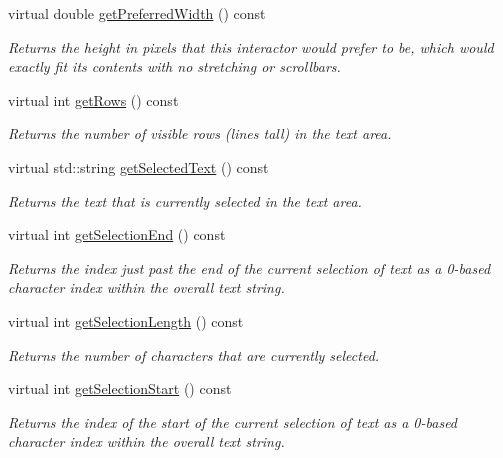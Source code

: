 \begin{DoxyCompactItemize}
virtual double \mbox{\hyperlink{classGInteractor_a82bca31d37700fb0e35d2743352efd5e}{get\+Preferred\+Width}} () const
\begin{DoxyCompactList}\small\item\em Returns the height in pixels that this interactor would prefer to be, which would exactly fit its contents with no stretching or scrollbars. \end{DoxyCompactList}\item 
virtual int \mbox{\hyperlink{classGTextArea_ad343f9bbb050d9037167e80e423ab4e8}{get\+Rows}} () const
\begin{DoxyCompactList}\small\item\em Returns the number of visible rows (lines tall) in the text area. \end{DoxyCompactList}\item 
virtual std\+::string \mbox{\hyperlink{classGTextArea_a512371b3f41599349f23389825a6ccf7}{get\+Selected\+Text}} () const
\begin{DoxyCompactList}\small\item\em Returns the text that is currently selected in the text area. \end{DoxyCompactList}\item 
virtual int \mbox{\hyperlink{classGTextArea_a2885313daa0e367cee2ccd0c704a6147}{get\+Selection\+End}} () const
\begin{DoxyCompactList}\small\item\em Returns the index just past the end of the current selection of text as a 0-\/based character index within the overall text string. \end{DoxyCompactList}\item 
virtual int \mbox{\hyperlink{classGTextArea_a68f7816694269b73e6284e756eb0c179}{get\+Selection\+Length}} () const
\begin{DoxyCompactList}\small\item\em Returns the number of characters that are currently selected. \end{DoxyCompactList}\item 
virtual int \mbox{\hyperlink{classGTextArea_aad7c986a677c1b9cf445cd7cfb6a8975}{get\+Selection\+Start}} () const
\begin{DoxyCompactList}\small\item\em Returns the index of the start of the current selection of text as a 0-\/based character index within the overall text string. \end{DoxyCompactList}\item 

\end{DoxyCompactItemize}
